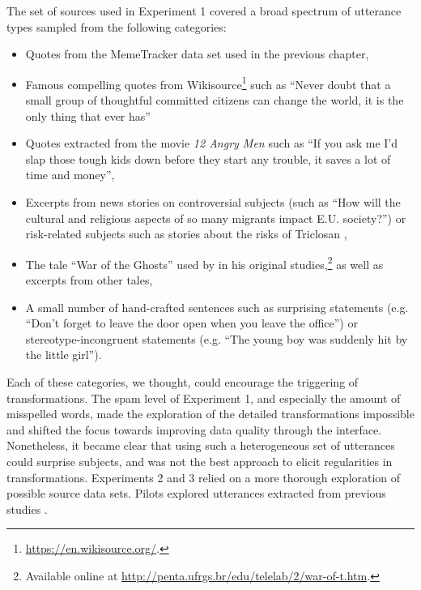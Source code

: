 The set of sources used in Experiment 1 covered a broad spectrum of
utterance types sampled from the following categories:

\begin{itemize}
\item
  Quotes from the MemeTracker data set used in the previous chapter,
\item
  Famous compelling quotes from Wikisource\footnote{\url{https://en.wikisource.org/}.}
  such as \enquote{Never doubt that a small group of thoughtful
  committed citizens can change the world, it is the only thing that
  ever has}
\item
  Quotes extracted from the movie \emph{12 Angry Men} such as
  \enquote{If you ask me I'd slap those tough kids down before they
  start any trouble, it saves a lot of time and money},
\item
  Excerpts from news stories on controversial subjects (such as
  \enquote{How will the cultural and religious aspects of so many
  migrants impact E.U. society?}) or risk-related subjects such as
  stories about the risks of Triclosan \autocite[used by][ in their
  study of the amplification of risk
  perception]{moussaid_amplification_2015},
\item
  The tale \enquote{War of the Ghosts} used by
  \textcite{bartlett_remembering:_1995} in his original
  studies,\footnote{Available online at
    \url{http://penta.ufrgs.br/edu/telelab/2/war-of-t.htm}.} as well as
  excerpts from other tales,
\item
  A small number of hand-crafted sentences such as surprising statements
  (e.g. \enquote{Don't forget to leave the door open when you leave the
  office}) or stereotype-incongruent statements (e.g. \enquote{The young
  boy was suddenly hit by the little girl}).
\end{itemize}

Each of these categories, we thought, could encourage the triggering of
transformations. The spam level of Experiment 1, and especially the
amount of misspelled words, made the exploration of the detailed
transformations impossible and shifted the focus towards improving data
quality through the interface. Nonetheless, it became clear that using
such a heterogeneous set of utterances could surprise subjects, and was
not the best approach to elicit regularities in transformations.
Experiments 2 and 3 relied on a more thorough exploration of possible
source data sets. Pilots explored utterances extracted from previous
studies \autocites[ on personification and increased
stereotypes]{bangerter_transformation_2000}[ on the role of
disgust]{heath_emotional_2001}[ on incoherent
stories]{maxwell_remembering_1936}[ for the role of social
information]{mesoudi_bias_2006}.

